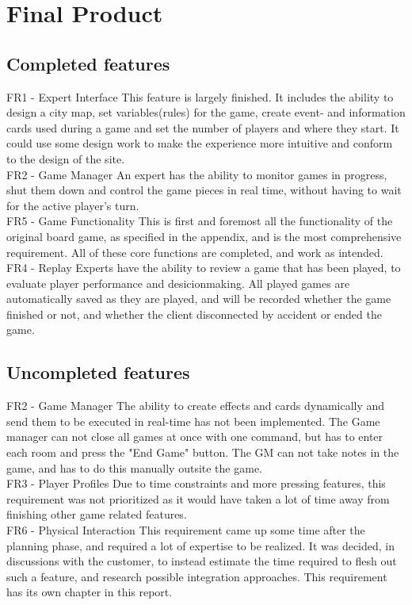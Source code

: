 \chapter{Final Product}

\section{Completed features}

FR1 - Expert Interface
This feature is largely finished. It includes the ability to design a city map, set variables(rules) for the game, create event- and information cards used during a game and set the number of players and where they start. It could use some design work to make the experience more intuitive and conform to the design of the site.
\\
FR2 - Game Manager
An expert has the ability to monitor games in progress, shut them down and control the game pieces in real time, without having to wait for the active player's turn.
\\
FR5 - Game Functionality
This is first and foremost all the functionality of the original board game, as specified in the appendix, and is the most comprehensive requirement. All of these core functions are completed, and work as intended.
\\
FR4 - Replay
Experts have the ability to review a game that has been played, to evaluate player performance and desicionmaking. All played games are automatically saved as they are played, and will be recorded whether the game finished or not, and whether the client disconnected by accident or ended the game.

\section{Uncompleted features}

FR2 - Game Manager
The ability to create effects and cards dynamically and send them to be executed in real-time has not been implemented. The Game manager can not close all games at once with one command, but has to enter each room and press the "End Game" button. The GM can not take notes in the game, and has to do this manually outsite the game.
\\
FR3 - Player Profiles
Due to time constraints and more pressing features, this requirement was not prioritized as it would have taken a lot of time away from finishing other game related features. 
\\
FR6 - Physical Interaction
This requirement came up some time after the planning phase, and required a lot of expertise to be realized. It was decided, in discussions with the customer, to instead estimate the time required to flesh out such a feature, and research possible integration approaches. This requirement has its own chapter in this report.


